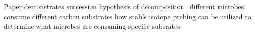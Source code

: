 \begin{itemize}Paper demonstrates succession hypothesis of decomposition
\
\Demonstrates different microbes consume different carbon substrates
\demonstrates how stable isotope probing can be utilized to determine what microbes are consuming specific subsrates
\end{itemize}

